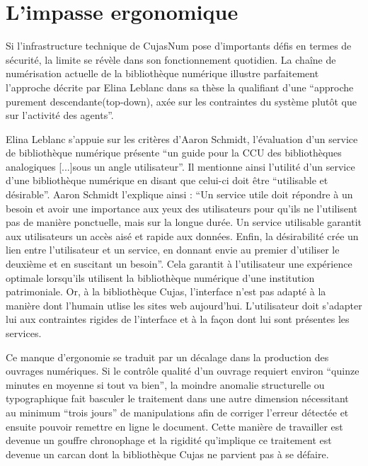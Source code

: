 \section{L'impasse ergonomique}
Si l'infrastructure technique de CujasNum pose d'importants défis en termes de sécurité, la limite se révèle dans son fonctionnement quotidien. La chaîne de numérisation actuelle de la bibliothèque numérique illustre parfaitement l'approche décrite par Elina Leblanc dans sa thèse la qualifiant d'une \enquote{approche purement descendante(top-down), axée sur les contraintes du système plutôt que sur l'activité des agents}.

Elina Leblanc s'appuie sur les critères d'Aaron Schmidt, l'évaluation d'un service de bibliothèque numérique présente \enquote{un guide pour la CCU des bibliothèques analogiques [...]sous un angle utilisateur}. Il mentionne ainsi l'utilité d'un service d'une bibliothèque numérique en disant que celui-ci doit être \enquote{utilisable et désirable}. Aaron Schmidt l'explique ainsi : \enquote{Un service utile doit répondre à un besoin et avoir une importance aux yeux des utilisateurs pour qu'ils ne l'utilisent pas de manière ponctuelle, mais sur la longue durée. Un service utilisable garantit aux utilisateurs un accès aisé et rapide aux données. Enfin, la désirabilité crée un lien entre l'utilisateur et un service, en donnant envie au premier d'utiliser le deuxième et en suscitant un besoin}. Cela garantit à l'utilisateur une expérience optimale lorsqu'ils utilisent la bibliothèque numérique d'une institution patrimoniale. Or, à la bibliothèque Cujas, l'interface n'est pas adapté à la manière dont l'humain utlise les sites web aujourd'hui. L'utilisateur doit s'adapter lui aux contraintes rigides de l'interface et à la façon dont lui sont présentes les services. 

Ce manque d'ergonomie se traduit par un décalage dans la production des ouvrages numériques. Si le contrôle qualité d'un ouvrage requiert environ \enquote{quinze minutes en moyenne si tout va bien}, la moindre anomalie structurelle ou typographique fait basculer le traitement dans une autre dimension nécessitant au minimum \enquote{trois jours} de manipulations afin de corriger l'erreur détectée et ensuite pouvoir remettre en ligne le document. Cette manière de travailler est devenue un gouffre chronophage et la rigidité qu'implique ce traitement est devenue un carcan dont la bibliothèque Cujas ne parvient pas à se défaire.

